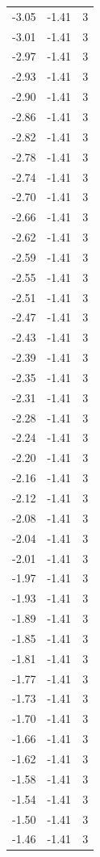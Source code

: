\begin{longtable}{lrr}
  -3.05 & -1.41 & 3 \\
  -3.01 & -1.41 & 3 \\
  -2.97 & -1.41 & 3 \\
  -2.93 & -1.41 & 3 \\
  -2.90 & -1.41 & 3 \\
  -2.86 & -1.41 & 3 \\
  -2.82 & -1.41 & 3 \\
  -2.78 & -1.41 & 3 \\
  -2.74 & -1.41 & 3 \\
  -2.70 & -1.41 & 3 \\
  -2.66 & -1.41 & 3 \\
  -2.62 & -1.41 & 3 \\
  -2.59 & -1.41 & 3 \\
  -2.55 & -1.41 & 3 \\
  -2.51 & -1.41 & 3 \\
  -2.47 & -1.41 & 3 \\
  -2.43 & -1.41 & 3 \\
  -2.39 & -1.41 & 3 \\
  -2.35 & -1.41 & 3 \\
  -2.31 & -1.41 & 3 \\
  -2.28 & -1.41 & 3 \\
  -2.24 & -1.41 & 3 \\
  -2.20 & -1.41 & 3 \\
  -2.16 & -1.41 & 3 \\
  -2.12 & -1.41 & 3 \\
  -2.08 & -1.41 & 3 \\
  -2.04 & -1.41 & 3 \\
  -2.01 & -1.41 & 3 \\
  -1.97 & -1.41 & 3 \\
  -1.93 & -1.41 & 3 \\
  -1.89 & -1.41 & 3 \\
  -1.85 & -1.41 & 3 \\
  -1.81 & -1.41 & 3 \\
  -1.77 & -1.41 & 3 \\
  -1.73 & -1.41 & 3 \\
  -1.70 & -1.41 & 3 \\
  -1.66 & -1.41 & 3 \\
  -1.62 & -1.41 & 3 \\
  -1.58 & -1.41 & 3 \\
  -1.54 & -1.41 & 3 \\
  -1.50 & -1.41 & 3 \\
  -1.46 & -1.41 & 3 \\

\end{longtable}
